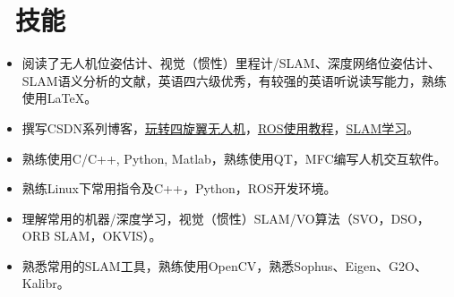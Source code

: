 \documentclass{resume}
\begin{document}
%


\section{\faCogs\ 技能}
\begin{itemize}\small
\item 阅读了无人机位姿估计、视觉（惯性）里程计/SLAM、深度网络位姿估计、SLAM语义分析的文献，英语四六级优秀，有较强的英语听说读写能力，熟练使用LaTeX。
\item 撰写CSDN系列博客，\href{http://blog.csdn.net/wendox/article/category/6026381}{玩转四旋翼无人机}，\href{http://blog.csdn.net/wendox/article/category/6390089}{ROS使用教程}，\href{http://blog.csdn.net/wendox/article/category/6555599}{SLAM学习}。
\item 熟练使用C/C++, Python, Matlab，熟练使用QT，MFC编写人机交互软件。
\item 熟练Linux下常用指令及C++，Python，ROS开发环境。
\item 理解常用的机器/深度学习，视觉（惯性）SLAM/VO算法（SVO，DSO，ORB SLAM，OKVIS）。
\item 熟悉常用的SLAM工具，熟练使用OpenCV，熟悉Sophus、Eigen、G2O、Kalibr。
\end{itemize}
\end{document}
